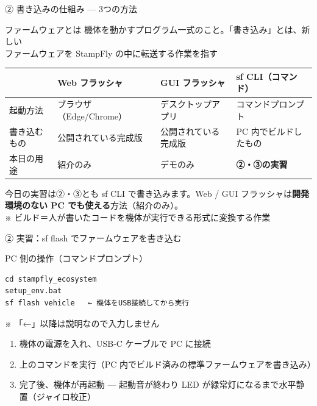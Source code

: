 \begin{frame}{② 書き込みの仕組み --- 3つの方法}
  \begin{block}{ファームウェアとは}
    \footnotesize 機体を動かすプログラム一式のこと。「書き込み」とは、新しい\\
    ファームウェアを StampFly の中に転送する作業を指す
  \end{block}

  \vspace{0.3em}

  \begin{table}
    \centering\footnotesize
    \begin{tabular}{l>{\raggedright\arraybackslash}p{28mm}>{\raggedright\arraybackslash}p{28mm}>{\raggedright\arraybackslash}p{34mm}}
      \hline
       & \textbf{Web フラッシャ} & \textbf{GUI フラッシャ} & \textbf{sf CLI（コマンド）} \\
      \hline
      起動方法     & ブラウザ（Edge/Chrome） & デスクトップアプリ & コマンドプロンプト \\
      書き込むもの & 公開されている完成版 & 公開されている完成版 & PC 内でビルドしたもの \\
      本日の用途   & 紹介のみ & デモのみ & \textbf{②・③の実習} \\
      \hline
    \end{tabular}
  \end{table}

  \vspace{0.3em}

  {\footnotesize 今日の実習は②・③とも sf CLI で書き込みます。Web / GUI フラッシャは\textbf{開発環境のない PC でも使える}方法（紹介のみ）。\\ ※ ビルド＝人が書いたコードを機体が実行できる形式に変換する作業}
\end{frame}

\begin{frame}[fragile]{② 実習：sf flash でファームウェアを書き込む}
  \begin{block}{PC 側の操作（コマンドプロンプト）}
    \begin{lstlisting}[style=sfbash, numbers=none]
cd stampfly_ecosystem
setup_env.bat
sf flash vehicle   ← 機体をUSB接続してから実行
    \end{lstlisting}
  \end{block}

  {\footnotesize ※ 「←」以降は説明なので入力しません}

  \vspace{0.2em}

  \begin{enumerate}\small
    \item 機体の電源を入れ、USB-C ケーブルで PC に接続
    \item 上のコマンドを実行（PC 内でビルド済みの標準ファームウェアを書き込み）
    \item 完了後、機体が再起動 --- 起動音が終わり LED が緑常灯になるまで水平静置（ジャイロ校正）
  \end{enumerate}
\end{frame}

